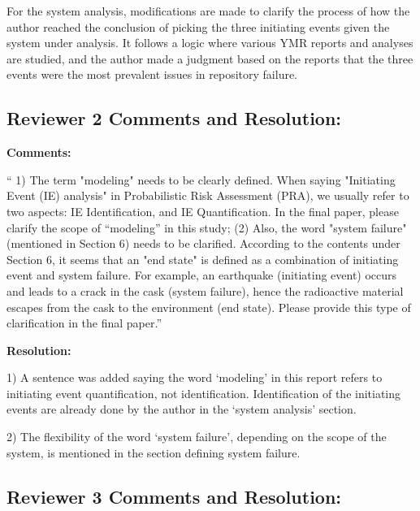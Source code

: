 \documentclass[12pt]{article}
\begin{document}
For the system analysis, modifications are made to clarify the process
of how the author reached the conclusion of picking the three initiating 
events given the system under analysis. It follows a logic where various
\gls{YMR} reports and analyses are studied, and the author made a judgment
based on the reports that the three events were the most prevalent issues
in repository failure.

\subsection{Reviewer 2 Comments and Resolution:}


\textbf{Comments:}
\begin{center}
    \begin{varwidth}{0.8\textwidth}


`` 1) The term "modeling" needs to be clearly defined. When saying "Initiating Event (IE) analysis" in Probabilistic Risk Assessment (PRA), we usually refer to two aspects: IE Identification, and IE Quantification. In the final paper, please clarify the scope of “modeling” in this study; (2) Also, the word "system failure" (mentioned in Section 6) needs to be clarified. According to the contents under Section 6, it seems that an "end state" is defined as a combination of initiating event and system failure. For example, an earthquake (initiating event) occurs and leads to a crack in the cask (system failure), hence the radioactive material escapes from the cask to the environment (end state). Please provide this type of clarification in the final paper.''

    \end{varwidth}
\end{center}

\noindent \textbf{Resolution:}

1) A sentence was added saying the word `modeling' in this report refers to 
initiating event quantification, not identification. Identification
of the initiating events are already done by the author in the 
`system analysis' section.

2) The flexibility of the word `system failure', depending on the 
scope of the system,  is mentioned in the section defining system failure.

\subsection{Reviewer 3 Comments and Resolution:}
\end{document}
